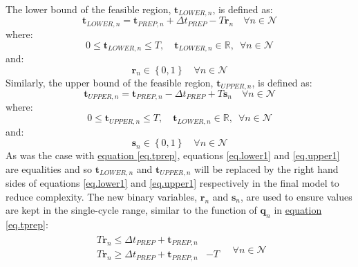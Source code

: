 The lower bound of the feasible region, $\boldsymbol{t}_{\mathit{LOWER},n}$, is
defined as:
\begin{equation}
    \boldsymbol{t}_{\mathit{LOWER},n} = \boldsymbol{t}_{\mathit{PREP},n} +
    \Delta t_{\mathit{PREP}} - T \boldsymbol{r}_{n} \quad \forall n \in
    \mathcal{N}
    \label{eq.lower1}
\end{equation}
where:
\begin{equation}
    0 \le \boldsymbol{t}_{\mathit{LOWER},n} \le T, \quad 
    \boldsymbol{t}_{\mathit{LOWER},n} \in \mathbb{R}, \enspace \forall n \in
    \mathcal{N}
    \label{eq.lower2}
\end{equation}
and:
\begin{equation}
    \boldsymbol{r}_{n} \in \left\{ 0, 1 \right\} \quad \forall n \in
    \mathcal{N}
    \label{eq.r}
\end{equation}
Similarly, the upper bound of the feasible region, 
$\boldsymbol{t}_{\mathit{UPPER},n}$, is defined as:
\begin{equation}
    \boldsymbol{t}_{\mathit{UPPER},n} = \boldsymbol{t}_{\mathit{PREP},n} -
    \Delta t_{\mathit{PREP}} + T \boldsymbol{s}_{n} \quad \forall n \in 
    \mathcal{N}
    \label{eq.upper1}
\end{equation}
where:
\begin{equation}
    0 \le \boldsymbol{t}_{\mathit{UPPER},n} \le T, \quad
    \boldsymbol{t}_{\mathit{LOWER},n} \in \mathbb{R}, \enspace \forall n \in 
    \mathcal{N}
    \label{eq.upper2}
\end{equation}
and:
\begin{equation}
    \boldsymbol{s}_{n} \in \left\{ 0, 1 \right\} \quad \forall n \in
    \mathcal{N}
    \label{eq.s}
\end{equation} 
As was the case with \hyperref[eq.tprep]{equation \ref*{eq.tprep}},
equations \ref{eq.lower1} and \ref{eq.upper1} are equalities and so 
$\boldsymbol{t}_{\mathit{LOWER},n}$ and $\boldsymbol{t}_{\mathit{UPPER},n}$
will be replaced by the right hand sides of equations \ref{eq.lower1} and
\ref{eq.upper1} respectively in the final model to reduce complexity.
The new binary variables, $\boldsymbol{r}_{n}$ and $\boldsymbol{s}_{n}$, are
used to ensure values are kept in the single-cycle range, similar to the
function of $\boldsymbol{q}_{n}$ in
\hyperref[eq.tprep]{equation \ref*{eq.tprep}}:
\begin{equation}
    \begin{split}
        \begin{alignedat}{2}
            T \boldsymbol{r}_{n} \le \Delta t_{\mathit{PREP}}
            + \boldsymbol{t}_{\mathit{PREP},n}&\\
            T \boldsymbol{r}_{n} \ge \Delta t_{\mathit{PREP}}
            + \boldsymbol{t}_{\mathit{PREP},n}& - T\\
            \end{alignedat}
        \quad \forall n \in \mathcal{N}
    \end{split}
    \label{eq.r1}
\end{equation}
